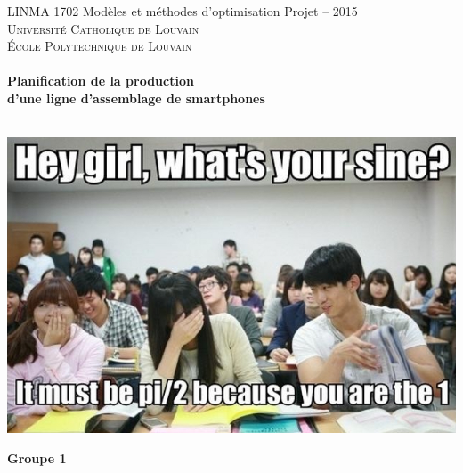 
\begin{titlepage}
      \center
      
      LINMA 1702 Mod\`{e}les et m\'{e}thodes d'optimisation \hfill Projet -- 2015\\ 
      \vspace{0.7cm}
      {\LARGE \textsc{Universit\'e Catholique de Louvain}}\\
      {\large \textsc{\'Ecole Polytechnique de Louvain}}\\

      
      \vspace{0.7cm}
      \hrulefill
      \\
      \vspace{0.7cm}
      {\huge \textbf{Planification de la production}} \\ 
      \vspace{0.7cm}
      {\huge \textbf{d'une ligne d'assemblage de smartphones}} \\
      \vspace{0.5cm}
      \hrulefill
      \\
      \vspace{0.3cm}
      
  \begin{center}
      \includegraphics*[height=0.4\textheight]{img/cover_photo.jpg}
      \end{center}      
      
      \vspace{0.2cm}      
      
	{ \Large
	\begin{center}
	\textbf{Groupe 1}
	\end{center}
	}
	

\end{titlepage}
